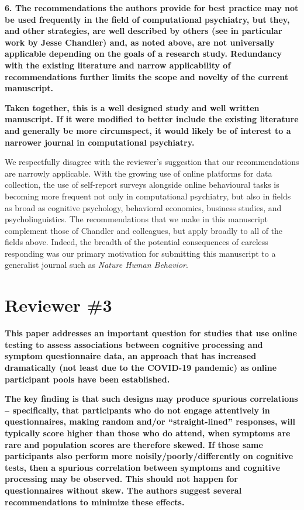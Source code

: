 \documentclass[a4paper,notitlepage,12pt]{article}
\begin{document}
\textbf{6. The recommendations the authors provide for best practice may not be used frequently in the field of computational psychiatry, but they, and other strategies, are well described by others (see in particular work by Jesse Chandler) and, as noted above, are not universally applicable depending on the goals of a research study. Redundancy with the existing literature and narrow applicability of recommendations further limits the scope and novelty of the current manuscript.}

\textbf{Taken together, this is a well designed study and well written manuscript. If it were modified to better include the existing literature and generally be more circumspect, it would likely be of interest to a narrower journal in computational psychiatry.}

We respectfully disagree with the reviewer's suggestion that our recommendations are narrowly applicable. With the growing use of online platforms for data collection, the use of self-report surveys alongside online behavioural tasks is becoming more frequent not only in computational psychiatry, but also in fields as broad as cognitive psychology, behavioral economics, business studies, and psycholinguistics. The recommendations that we make in this manuscript complement those of Chandler and colleagues, but apply broadly to all of the fields above. Indeed, the breadth of the potential consequences of careless responding was our primary motivation for submitting this manuscript to a generalist journal such as \textit{Nature Human Behavior}.

\section*{Reviewer \#3}

\textbf{This paper addresses an important question for studies that use online testing to assess associations between cognitive processing and symptom questionnaire data, an approach that has increased dramatically (not least due to the COVID-19 pandemic) as online participant pools have been established.}

\textbf{The key finding is that such designs may produce spurious correlations – specifically, that participants who do not engage attentively in questionnaires, making random and/or ``straight-lined'' responses, will typically score higher than those who do attend, when symptoms are rare and population scores are therefore skewed. If those same participants also perform more noisily/poorly/differently on cognitive tests, then a spurious correlation between symptoms and cognitive processing may be observed. This should not happen for questionnaires without skew. The authors suggest several recommendations to minimize these effects.}
\end{document}

